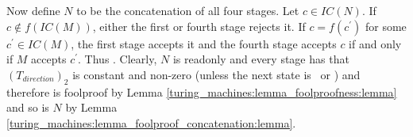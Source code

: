 	Now define $N$ to be the concatenation of all four stages. Let $c \in IC(N)$.
	If $c \notin f(IC(M))$, either the first or fourth stage rejects it.
	If $c = f(c^\prime)$ for some $c^\prime \in IC(M)$, the first stage accepts it and the fourth stage accepts $c$ if and only if $M$ accepts $c^\prime$. Thus .
%
	Clearly, $N$ is readonly and every stage has that $(T_{direction})_2$ is constant and non-zero (unless the next state is \ACC~or \REJ)
	and therefore is foolproof by Lemma \ref{turing_machines:lemma_foolproofness:lemma}
	and so is $N$ by Lemma \ref{turing_machines:lemma_foolproof_concatenation:lemma}.

\endproof

